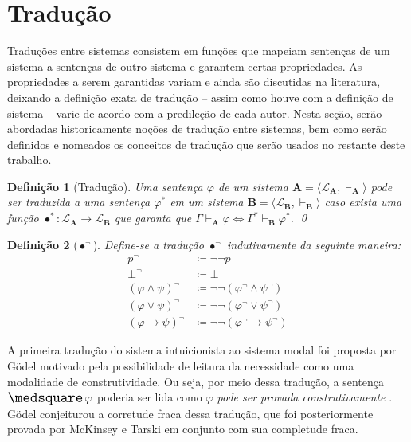 \documentclass{report}
\newtheorem{definition}{Definição}
\begin{document}
    \section{Tradução}

    Traduções entre sistemas consistem em funções que mapeiam sentenças de um sistema a sentenças de outro sistema e garantem certas propriedades. As propriedades a serem garantidas variam e ainda são discutidas na literatura, deixando a definição exata de tradução -- assim como houve com a definição de sistema -- varie de acordo com a predileção de cada autor. Nesta seção, serão abordadas historicamente noções de tradução entre sistemas, bem como serão definidos e nomeados os conceitos de tradução que serão usados no restante deste trabalho.

    \begin{definition}[Tradução] 
        Uma sentença $\varphi$ de um sistema $\mathbf{A} = \langle \mathcal{L}_\mathbf{A}, \vdash_\mathbf{A}\rangle$ pode ser traduzida a uma sentença $\varphi^*$ em um sistema $\mathbf{B} = \langle \mathcal{L}_\mathbf{B}, \vdash_\mathbf{B} \rangle$ caso exista uma função $\bullet^* : \mathcal{L}_\mathbf{A} \to \mathcal{L}_\mathbf{B}$ que garanta que $\Gamma \vdash_\mathbf{A} \varphi \Leftrightarrow \Gamma^* \vdash_\mathbf{B} \varphi^*$.
        \qed
    \end{definition}

    \begin{definition}[$\bullet^\neg$] Define-se a tradução $\bullet^\neg$ indutivamente da seguinte maneira:
        \begin{align*}
            p^\neg                     & \coloneqq \neg\neg p                               \\
            \bot^\neg                  & \coloneqq \bot                                     \\
            (\varphi \wedge \psi)^\neg & \coloneqq \neg\neg (\varphi^\neg \wedge \psi^\neg) \\
            (\varphi \vee \psi)^\neg   & \coloneqq \neg\neg (\varphi^\neg \vee \psi^\neg)   \\
            (\varphi \to \psi)^\neg    & \coloneqq \neg\neg (\varphi^\neg \to \psi^\neg)
            \tag*{\qed} 
        \end{align*}
    \end{definition}

    A primeira tradução do sistema intuicionista ao sistema modal foi proposta por Gödel \cite{Gödel} motivado pela possibilidade de leitura da necessidade como uma modalidade de construtividade. Ou seja, por meio dessa tradução, a sentença $\nec \varphi$ poderia ser lida como \textit{$\varphi$ pode ser provada construtivamente} \cite{Troelstra}. Gödel conjeiturou a corretude fraca dessa tradução, que foi posteriormente provada por McKinsey e Tarski \cite{McKinsey} em conjunto com sua completude fraca.
\end{document}

